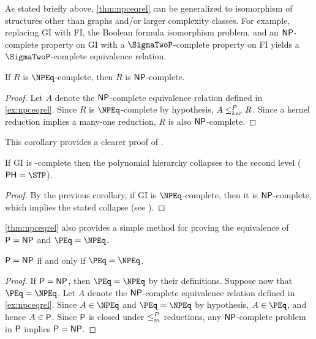\begin{example}
  As stated briefly above, \autoref{thm:npceqrel} can be generalized to isomorphism of structures other than graphs and/or larger complexity classes.
  For example, replacing \textsc{GI} with \textsc{FI}, the Boolean formula isomorphism problem, and an $\NP$-complete property on \textsc{GI} with a $\SigmaTwoP$-complete property on \textsc{FI} yields a $\SigmaTwoP$-complete equivalence relation.
\end{example}

\begin{corollary}
  If $R$ is $\NPEq$-complete, then $R$ is $\NP$-complete.
\end{corollary}
\begin{proof}
  Let $A$ denote the $\NP$-complete equivalence relation defined in \autoref{ex:npceqrel}.
  Since $R$ is $\NPEq$-complete by hypothesis, $A \kr R$.
  Since a kernel reduction implies a many-one reduction, $R$ is also $\NP$-complete.
\end{proof}

This corollary provides a clearer proof of \autocite[Proposition~8.1]{bcffm}.

\begin{corollary}
  If \textsc{GI} is \NPEq-complete then the polynomial hierarchy collapses to the second level ($\PH = \STP$).
\end{corollary}
\begin{proof}
  By the previous corollary, if \textsc{GI} is $\NPEq$-complete, then it is $\NP$-complete, which implies the stated collapse (see \autocite{schoning87}).
\end{proof}

\autoref{thm:npceqrel} also provides a simple method for proving the equivalence of $\P = \NP$ and $\PEq = \NPEq$.

\begin{theorem}\label{thm:pnppeqnpeq}
  $\P = \NP$ if and only if $\PEq = \NPEq$.
\end{theorem}
\begin{proof}
  If $\P = \NP$, then $\PEq = \NPEq$ by their definitions.
  Suppose now that $\PEq = \NPEq$.
  Let $A$ denote the $\NP$-complete equivalence relation defined in \autoref{ex:npceqrel}.
  Since $A \in \NPEq$ and $\PEq = \NPEq$ by hypothesis, $A \in \PEq$, and hence $A \in \P$.
  Since $\P$ is closed under $\mor$ reductions, any $\NP$-complete problem in $\P$ implies $\P = \NP$.
\end{proof}


